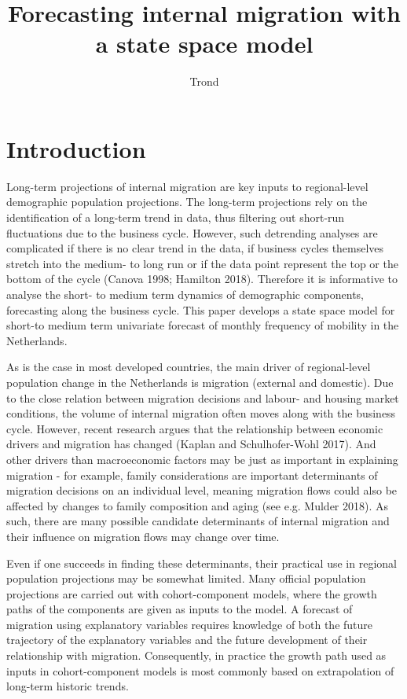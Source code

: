 \documentclass[]{article}
\title{Forecasting internal migration with a state space model}
\author{Trond}
\date{}
\begin{document}
\maketitle

\section{Introduction}\label{introduction}

Long-term projections of internal migration are key inputs to
regional-level demographic population projections. The long-term
projections rely on the identification of a long-term trend in data,
thus filtering out short-run fluctuations due to the business cycle.
However, such detrending analyses are complicated if there is no clear
trend in the data, if business cycles themselves stretch into the
medium- to long run or if the data point represent the top or the bottom
of the cycle (Canova 1998; Hamilton 2018). Therefore it is informative
to analyse the short- to medium term dynamics of demographic components,
forecasting along the business cycle. This paper develops a state space
model for short-to medium term univariate forecast of monthly frequency
of mobility in the Netherlands.

As is the case in most developed countries, the main driver of
regional-level population change in the Netherlands is migration
(external and domestic). Due to the close relation between migration
decisions and labour- and housing market conditions, the volume of
internal migration often moves along with the business cycle. However,
recent research argues that the relationship between economic drivers
and migration has changed (Kaplan and Schulhofer-Wohl 2017). And other
drivers than macroeconomic factors may be just as important in
explaining migration - for example, family considerations are important
determinants of migration decisions on an individual level, meaning
migration flows could also be affected by changes to family composition
and aging (see e.g. Mulder 2018). As such, there are many possible
candidate determinants of internal migration and their influence on
migration flows may change over time.

Even if one succeeds in finding these determinants, their practical use
in regional population projections may be somewhat limited. Many
official population projections are carried out with cohort-component
models, where the growth paths of the components are given as inputs to
the model. A forecast of migration using explanatory variables requires
knowledge of both the future trajectory of the explanatory variables and
the future development of their relationship with migration.
Consequently, in practice the growth path used as inputs in
cohort-component models is most commonly based on extrapolation of
long-term historic trends.
\end{document}
